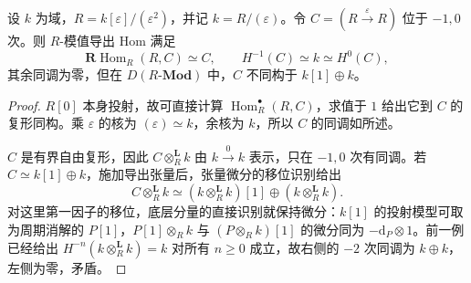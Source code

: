 \begin{proposition}\label{b4:prop:derived-cohomology-not-split}
	设 \(k\) 为域，\(R=k[\varepsilon]/(\varepsilon^2)\)，并记 \(k=R/(\varepsilon)\)。令 \(C=(R\xrightarrow{\varepsilon}R)\) 位于 \(-1,0\) 次。则 \(R\)-模值导出 Hom 满足
	\[
		\mathbf R\operatorname{Hom}_R(R,C)\simeq C,\qquad H^{-1}(C)\simeq k\simeq H^0(C),
	\]
	其余同调为零，但在 \(D(R\text{-}\mathbf{Mod})\) 中，\(C\) 不同构于 \(k[1]\oplus k\)。
\end{proposition}
\begin{proof}
	\(R[0]\) 本身投射，故可直接计算 \(\operatorname{Hom}_R^\bullet(R,C)\)，求值于 \(1\) 给出它到 \(C\) 的复形同构。乘 \(\varepsilon\) 的核为 \((\varepsilon)\simeq k\)，余核为 \(k\)，所以 \(C\) 的同调如所述。

	\(C\) 是有界自由复形，因此 \(C\otimes_R^{\mathbf L}k\) 由 \(k\xrightarrow{0}k\) 表示，只在 \(-1,0\) 次有同调。若 \(C\simeq k[1]\oplus k\)，施加导出张量后，张量微分的移位识别给出
	\[
		C\otimes_R^{\mathbf L}k \simeq(k\otimes_R^{\mathbf L}k)[1] \oplus(k\otimes_R^{\mathbf L}k).
	\]
	对这里第一因子的移位，底层分量的直接识别就保持微分：\(k[1]\) 的投射模型可取为周期消解的 \(P[1]\)，\(P[1]\otimes_R k\) 与 \((P\otimes_R k)[1]\) 的微分同为 \(-\mathrm{d}_P\otimes1\)。前一例已经给出 \(H^{-n}(k\otimes_R^{\mathbf L}k)=k\) 对所有 \(n\ge0\) 成立，故右侧的 \(-2\) 次同调为 \(k\oplus k\)，左侧为零，矛盾。
\end{proof}
